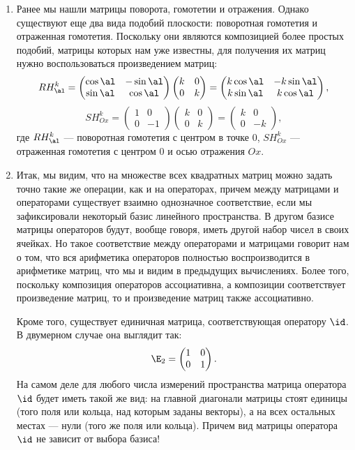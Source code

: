 \begin{enumerate}
\item Ранее мы нашли матрицы поворота, гомотетии и отражения. Однако существуют еще два вида подобий плоскости: поворотная гомотетия и отраженная гомотетия. Поскольку они являются композицией более простых подобий, матрицы которых нам уже известны, для получения их матриц нужно воспользоваться произведением матриц:
$$
RH_\al^k = 
\begin{pmatrix}
\cos\al & -\sin\al \\ \sin\al & \cos\al
\end{pmatrix}
\begin{pmatrix}
k & 0 \\ 0 & k
\end{pmatrix} =
\begin{pmatrix}
k\cos\al & -k\sin\al \\ k\sin\al & k\cos\al
\end{pmatrix},
$$
$$
SH_{Ox}^k =
\begin{pmatrix}
1 & 0 \\ 0 & -1
\end{pmatrix}
\begin{pmatrix}
k & 0 \\ 0 & k
\end{pmatrix} =
\begin{pmatrix}
k & 0 \\ 0 & -k
\end{pmatrix},
$$
где $RH_\al^k$ --- поворотная гомотетия с центром в точке $0$, $SH_{Ox}^k$ --- отраженная гомотетия с центром $0$ и осью отражения $Ox$.




\item Итак, мы видим, что на множестве всех квадратных матриц можно задать точно такие же операции, как и на операторах, причем между матрицами и операторами существует взаимно однозначное соответствие, если мы зафиксировали некоторый базис линейного пространства. В другом базисе матрицы операторов будут, вообще говоря, иметь другой набор чисел в своих ячейках. Но такое соответствие между операторами и матрицами говорит нам о том, что вся арифметика операторов полностью воспроизводится в арифметике матриц, что мы и видим в предыдущих вычислениях. Более того, поскольку композиция операторов ассоциативна, а композиции соответствует произведение матриц, то и произведение матриц также ассоциативно.

Кроме того, существует единичная матрица, соответствующая оператору $\id$. В двумерном случае она выглядит так:
$$
\E_2=\begin{pmatrix}
1 & 0 \\ 0 & 1
\end{pmatrix}.
$$
На самом деле для любого числа измерений пространства матрица оператора $\id$ будет иметь такой же вид: на главной диагонали матрицы стоят единицы (того поля или кольца, над которым заданы векторы), а на всех остальных местах --- нули (того же поля или кольца). Причем вид матрицы оператора $\id$ не зависит от выбора базиса!


\end{enumerate}
